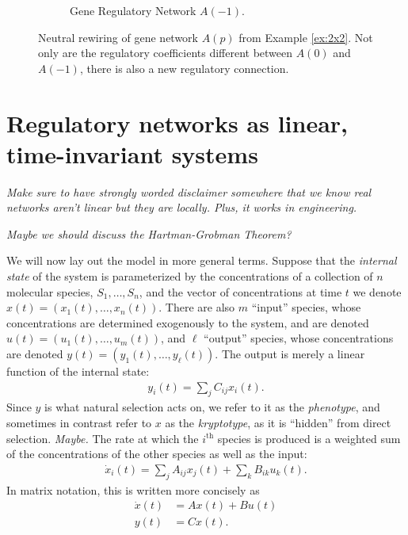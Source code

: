 \documentclass[11 pt]{article}
\newcommand{\plr}[1]{{\color{blue}\it #1}}
\newcommand{\jss}[1]{{\color{olive}\it #1}}
\newcommand{\ddt}{\dot}
\begin{document}
\begin{figure}
\begin{subfigure}{0.5\textwidth}
\begin{tikzpicture}
\end{tikzpicture}
    \caption{Gene Regulatory Network $A(-1)$.}
  \end{subfigure}
  \caption{Neutral rewiring of gene network $A(p)$ from Example \ref{ex:2x2}. Not only are the regulatory coefficients different between $A(0)$ and $A(-1)$, there is also a new regulatory connection.}
\end{figure}


\section{Regulatory networks as linear, time-invariant systems}

\plr{Make sure to have strongly worded disclaimer somewhere
that we know real networks aren't linear
but they are locally.
Plus, it works in engineering.}

\jss{Maybe we should discuss the Hartman-Grobman Theorem?}


We will now lay out the model in more general terms.
Suppose that the \emph{internal state} of the system
is parameterized by the concentrations of a collection of $n$ molecular species,
$S_1, \ldots, S_n$,
and the vector of concentrations at time $t$ we denote $x(t)=(x_1(t),\ldots,x_n(t))$.
There are also $m$ ``input'' species, whose concentrations are determined
exogenously to the system,
and are denoted $u(t) = (u_1(t),\ldots,u_m(t))$,
and $\ell$ ``output'' species, whose concentrations are denoted
$y(t) = (y_1(t),\ldots,y_\ell(t))$.
The output is merely a linear function of the internal state:
\begin{align*}
    y_i(t) = \sum_j C_{ij} x_i(t).
\end{align*}
Since $y$ is what natural selection acts on, we refer to it as the \emph{phenotype},
and sometimes in contrast refer to $x$ as the \emph{kryptotype},
as it is ``hidden'' from direct selection.
\plr{Maybe.}
The rate at which the $i^\text{th}$ species is produced
is a weighted sum of the concentrations of the other species
as well as the input:
\begin{align*}
    \ddt x_i(t) = \sum_j A_{ij} x_j(t) + \sum_k B_{ik} u_k(t) .
\end{align*}
In matrix notation, this is written more concisely as
\begin{align} \label{eqn:lti_system}
    \ddt x(t) &= A x(t) + B u(t) \\
    y(t) &= C x(t) .
\end{align}
\end{document}
